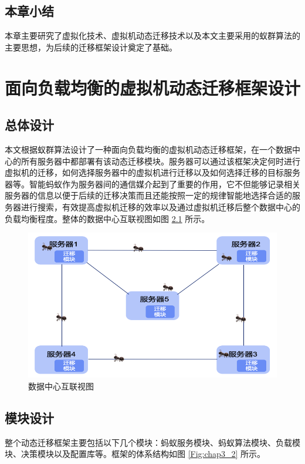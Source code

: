 \section{本章小结}
本章主要研究了虚拟化技术、虚拟机动态迁移技术以及本文主要采用的蚁群算法的主要思想，为后续的迁移框架设计奠定了基础。

\chapter{面向负载均衡的虚拟机动态迁移框架设计}

\section{总体设计}
本文根据蚁群算法设计了一种面向负载均衡的虚拟机动态迁移框架，在一个数据中心的所有服务器中都部署有该动态迁移模块。服务器可以通过该框架决定何时进行虚拟机的迁移，如何选择服务器中的虚拟机进行迁移以及如何选择迁移的目标服务器等。智能蚂蚁作为服务器间的通信媒介起到了重要的作用，它不但能够记录相关服务器的信息以便于后续的迁移决策而且还能按照一定的规律智能地选择合适的服务器进行搜索，有效提高虚拟机迁移的效率以及通过虚拟机迁移后整个数据中心的负载均衡程度。整体的数据中心互联视图如图 \ref{Fig:chap3_1} 所示。

\begin{figure}[htb]
  \centering
  \includegraphics{./Figure/IMG_Chap3_1.png}
  \caption{数据中心互联视图}\label{Fig:chap3_1}
\end{figure}

\section{模块设计}
整个动态迁移框架主要包括以下几个模块：蚂蚁服务模块、蚂蚁算法模块、负载模块、决策模块以及配置库等。框架的体系结构如图 \ref{Fig:chap3_2} 所示。

